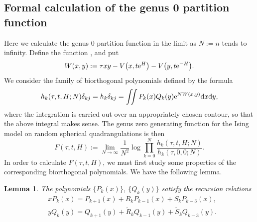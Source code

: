 \documentclass[10pt,a4paper]{amsart}
\numberwithin{equation}{section}
\newtheorem{Lemma}[Theorem]{Lemma}
\begin{document}
\subsection[Formal calculation of the genus 0 partition function]{Formal calculation of the genus $\boldsymbol{0}$ partition function} \label{Genus0-B}
Here we calculate the genus $0$ partition function in the limit as $N:=n$ tends to infinity.
Define the function , and put
 \begin{equation*}
 W(x,y) := \tau xy - V\bigl(x,t{\rm e}^{H}\bigr) - V\bigl(y,t{\rm e}^{-H}\bigr).
 \end{equation*}
We consider the family of biorthogonal polynomials defined by the formula
 \begin{equation*}
 h_k(\tau,t,H;N)\delta_{kj} = h_k\delta_{kj} = \iint P_k(x) Q_k(y) {\rm e}^{NW(x,y)} {\rm d}x{\rm d}y,
 \end{equation*}
where the integration is carried out over an appropriately chosen contour, so that the above integral makes sense. The genus zero generating function for
the Ising model on random spherical quadrangulations is then
 \begin{equation*}
 F(\tau,t,H) := \lim_{N \to \infty} \frac{1}{N^2} \log \prod_{k=0}^N \frac{h_k(\tau,t,H;N)}{h_k(\tau,0,0;N)}.
 \end{equation*}
In order to calculate $F(\tau,t,H)$, we must first study some properties of the corresponding biorthogonal polynomials. We have the following lemma.
\begin{Lemma}
 The polynomials $\{P_k(x)\}$, $\{Q_k(y)\}$ satisfy the recursion relations
 \begin{align}
 &xP_k(x)= P_{k+1}(x) + R_k P_{k-1}(x) + S_k P_{k-3}(x), \label{A}\\
 &yQ_k(y)= Q_{k+1}(y) + \tilde{R}_k Q_{k-1}(y) + \tilde{S}_k Q_{k-3}(y).\label{B}
 \end{align}
\end{Lemma}
\end{document}
